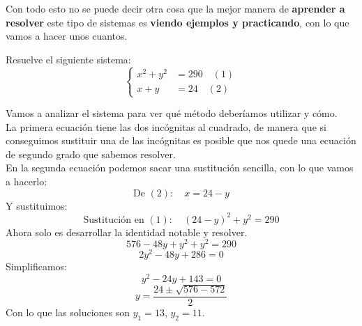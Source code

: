 \documentclass[a4paper,11pt,answers]{exam}
\begin{document}
Con todo esto no se puede decir otra cosa que la mejor manera de \textbf{aprender a resolver}
este tipo de sistemas es \textbf{viendo ejemplos y practicando}, con lo que vamos a hacer unos
cuantos.
\begin{questions}
\question Resuelve el siguiente sistema:
  \[
    \begin{cases}
      x^2 + y^2 & = 290\quad (1)\\
      x+y &= 24\quad (2)
    \end{cases}
    \]
    \begin{solution}
      Vamos a analizar el sistema para ver qué método deberíamos utilizar y cómo.\\
      La primera ecuación tiene las dos incógnitas al cuadrado, de manera que si conseguimos
      sustituir una de las incógnitas es posible que nos quede una ecuación de segundo grado
      que sabemos resolver.\\
      En la segunda ecuación podemos sacar una sustitución sencilla, con lo que vamos a hacerlo:
      \[\text{De } (2):\quad x =  24 - y\]
      Y sustituimos:
      \[\text{Sustitución en } (1):\quad (24 - y)^2 + y^2 = 290\]
      Ahora solo es desarrollar la identidad notable y resolver.
      \[576 - 48y +y^2 +y^2 = 290\]
      \[2y^2 -48y + 286 = 0\]
      Simplificamos:
      \[y^2 -24y + 143 = 0\]
      \[y = \frac{24 \pm \sqrt{576 - 572}}{2}\]
      Con lo que las soluciones son $y_1 = 13$, $y_2 = 11$.


\end{solution}
\end{questions}
\end{document}
